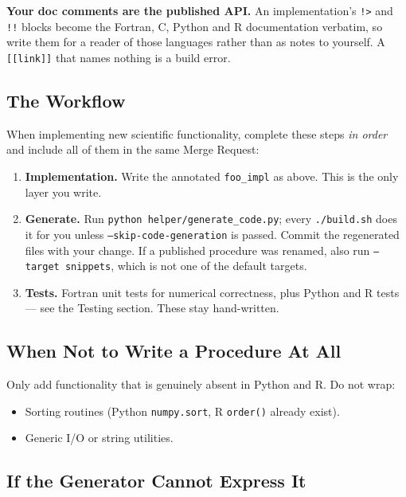 \documentclass{article}
\begin{document}
\textbf{Your doc comments are the published API.} An implementation's \texttt{!>} and \texttt{!!}
blocks become the Fortran, C, Python and R documentation verbatim, so write them for a reader of
those languages rather than as notes to yourself. A \texttt{[[link]]} that names nothing is a build
error.

\subsection{The Workflow}

When implementing new scientific functionality, complete these steps \emph{in order} and include all
of them in the same Merge Request:

\begin{enumerate}
  \item \textbf{Implementation.} Write the annotated \texttt{foo\_impl} as above. This is the only
        layer you write.
  \item \textbf{Generate.} Run \texttt{python helper/generate\_code.py}; every \texttt{./build.sh}
        does it for you unless \texttt{--skip-code-generation} is passed. Commit the regenerated
        files with your change. If a published procedure was renamed, also run
        \texttt{--target snippets}, which is not one of the default targets.
  \item \textbf{Tests.} Fortran unit tests for numerical correctness, plus Python and R tests — see
        the Testing section. These stay hand-written.
\end{enumerate}

\subsection{When Not to Write a Procedure At All}

Only add functionality that is genuinely absent in Python and R. Do not wrap:

\begin{itemize}
  \item Sorting routines (Python \texttt{numpy.sort}, R \texttt{order()} already exist).
  \item Generic I/O or string utilities.
\end{itemize}

\subsection{If the Generator Cannot Express It}
\end{document}
